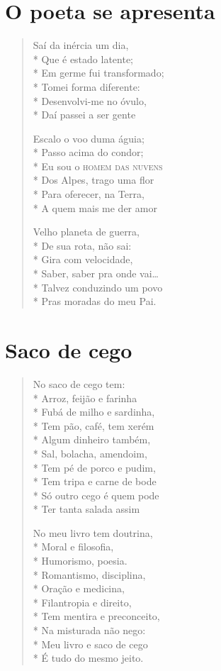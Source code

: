 \chapter{O poeta se apresenta}

\begin{verse}
Saí da inércia um dia,\\*
Que é estado latente;\\*
Em germe fui transformado;\\*
Tomei forma diferente:\\*
Desenvolvi-me no óvulo,\\*
Daí passei a ser gente

Escalo o voo duma águia;\\*
Passo acima do condor;\\*
Eu sou o \textsc{homem das nuvens}\\*
Dos Alpes, trago uma flor\\*
Para oferecer, na Terra,\\*
A quem mais me der amor

Velho planeta de guerra,\\*
De sua rota, não sai:\\*
Gira com velocidade,\\*
Saber, saber pra onde vai\ldots{}\\*
Talvez conduzindo um povo\\*
Pras moradas do meu Pai.
\end{verse}

\chapter{Saco de cego}

\begin{verse}
No saco de cego tem:\\*
Arroz, feijão e farinha\\*
Fubá de milho e sardinha,\\*
Tem pão, café, tem xerém\\*
Algum dinheiro também,\\*
Sal, bolacha, amendoim,\\*
Tem pé de porco e pudim,\\*
Tem tripa e carne de bode\\*
Só outro cego é quem pode\\*
Ter tanta salada assim

No meu livro tem doutrina,\\*
Moral e filosofia,\\*
Humorismo, poesia.\\*
Romantismo, disciplina,\\*
Oração e medicina,\\*
Filantropia e direito,\\*
Tem mentira e preconceito,\\*
Na misturada não nego:\\*
Meu livro e saco de cego\\*
É tudo do mesmo jeito.
\end{verse}



